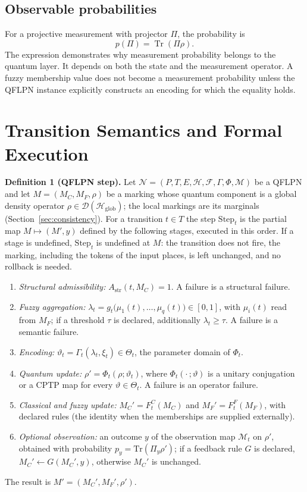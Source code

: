 \documentclass[final,3p,times]{elsarticle}
\begin{document}
\subsection{Observable probabilities}

For a projective measurement with projector $\Pi$, the probability is
\begin{equation}
    p(\Pi)=\operatorname{Tr}(\Pi\rho).
\end{equation}
The expression demonstrates why measurement probability belongs to the quantum layer. It depends on both the state and the measurement operator. A fuzzy membership value does not become a measurement probability unless the QFLPN instance explicitly constructs an encoding for which the equality holds.

\section{Transition Semantics and Formal Execution}\label{sec:step}

\noindent\textbf{Definition 1 (QFLPN step).} Let $\mathcal N=(P,T,E,\mathcal H,\mathcal F,\Gamma,\Phi,\mathcal M)$ be a QFLPN and let $M=(M_C,M_F,\rho)$ be a marking whose quantum component is a global density operator $\rho\in\mathcal D(\mathcal H_{\mathrm{glob}})$; the local markings are its marginals (Section~\ref{sec:consistency}). For a transition $t\in T$ the step $\mathrm{Step}_t$ is the partial map $M\mapsto(M',y)$ defined by the following stages, executed in this order. If a stage is undefined, $\mathrm{Step}_t$ is undefined at $M$: the transition does not fire, the marking, including the tokens of the input places, is left unchanged, and no rollback is needed.
\begin{enumerate}
\item[(S1)] \emph{Structural admissibility:} $A_{\mathrm{str}}(t,M_C)=1$. A failure is a structural failure.
\item[(S2)] \emph{Fuzzy aggregation:} $\lambda_t=g_t\big(\mu_1(t),\ldots,\mu_q(t)\big)\in[0,1]$, with $\mu_i(t)$ read from $M_F$; if a threshold $\tau$ is declared, additionally $\lambda_t\ge\tau$. A failure is a semantic failure.
\item[(S3)] \emph{Encoding:} $\vartheta_t=\Gamma_t(\lambda_t,\xi_t)\in\Theta_t$, the parameter domain of $\Phi_t$.
\item[(S4)] \emph{Quantum update:} $\rho'=\Phi_t(\rho;\vartheta_t)$, where $\Phi_t(\cdot\,;\vartheta)$ is a unitary conjugation or a CPTP map for every $\vartheta\in\Theta_t$. A failure is an operator failure.
\item[(S5)] \emph{Classical and fuzzy update:} $M_C'=F_t^{C}(M_C)$ and $M_F'=F_t^{F}(M_F)$, with declared rules (the identity when the memberships are supplied externally).
\item[(S6)] \emph{Optional observation:} an outcome $y$ of the observation map $\mathcal M_t$ on $\rho'$, obtained with probability $p_y=\mathrm{Tr}(\Pi_y\rho')$; if a feedback rule $G$ is declared, $M_C'\leftarrow G(M_C',y)$, otherwise $M_C'$ is unchanged.
\end{enumerate}
The result is $M'=(M_C',M_F',\rho')$.
\end{document}
